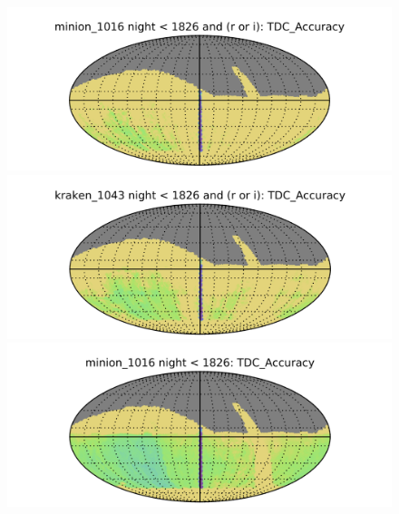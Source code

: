 \begin{figure}[!ht]
  \capstart
  \begin{minipage}[b]{\linewidth}
    \begin{minipage}[b]{0.48\linewidth}
       \centering\includegraphics[width=\linewidth]{figs/lenstimedelays/minion_1016_TDC_Accuracy_night_lt_1826_and_r_or_i_HEAL_SkyMap.png}
    \end{minipage} \hfill
    \begin{minipage}[b]{0.48\linewidth}
       \centering\includegraphics[width=\linewidth]{figs/lenstimedelays/kraken_1043_TDC_Accuracy_night_lt_1826_and_r_or_i_HEAL_SkyMap.png}
    \end{minipage}
  \end{minipage}
  \begin{minipage}[b]{\linewidth}
    \begin{minipage}[b]{0.48\linewidth}
       \centering\includegraphics[width=\linewidth]{figs/lenstimedelays/minion_1016_TDC_Accuracy_night_lt_1826_HEAL_SkyMap.png}

\end{minipage}
\end{minipage}
\end{figure}
